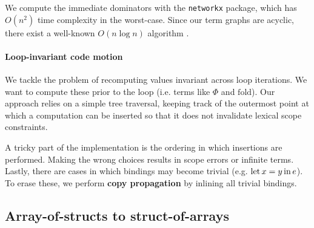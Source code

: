 We compute the immediate dominators with the \texttt{networkx} package, which has $O(n^2)$ time complexity in the worst-case. Since our term graphs are acyclic, there exist a well-known $O(n \log n)$ algorithm \cite{ramalingam1994incremental}.

\paragraph{Loop-invariant code motion} We tackle the problem of recomputing values invariant across loop iterations. We want to compute these prior to the loop (i.e. terms like $\Phi$ and $\mathrm{fold}$). Our approach relies on a simple tree traversal, keeping track of the outermost point at which a computation can be inserted so that it does not invalidate lexical scope constraints.


A tricky part of the implementation is the ordering in which insertions are performed. Making the wrong choices results in scope errors or infinite terms. 
Lastly, there are cases in which bindings may become trivial (e.g. $\mathrm{let}\,{x}={y}\,\mathrm{in}\,{e}$). To erase these, we perform \textbf{copy propagation} by inlining all trivial bindings.

\needspace{3em}
\subsection{Array-of-structs to struct-of-arrays}
\label{aos-to-soa}

